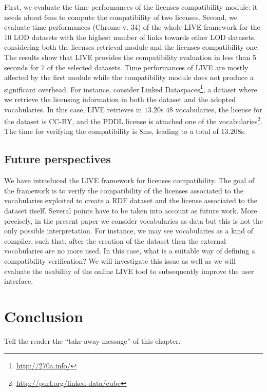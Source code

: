 First, we evaluate the time performances of the licenses compatibility module: it needs about 6ms to compute the compatibility of two licenses. Second, we evaluate time performances (Chrome v. 34) of the whole LIVE framework for the $10$ LOD datasets with the highest number of links towards other LOD datasets, considering both the licenses retrieval module and the licenses compatibility one. The results show that LIVE provides the compatibility evaluation in less than 5 seconds for $7$ of the selected datasets. Time performances of LIVE are mostly affected by the first module while the compatibility module does not produce a significant overhead. For instance, consider Linked Dataspaces\footnote{\url{http://270a.info/}}, a dataset where we retrieve the licensing information in both the dataset and the adopted vocabularies. In this case, LIVE retrieves in $13.20$s $48$ vocabularies, the license for the dataset is CC-BY, and the PDDL license is attached one of the vocabularies\footnote{\url{http://purl.org/linked-data/cube}}. The time for verifying the compatibility is $8$ms, leading to a total of $13.208$s.

\subsection{Future perspectives}
We have introduced the LIVE framework for licenses compatibility. The goal of the framework is to verify the compatibility of the licenses associated to the vocabularies exploited to create a RDF dataset and the license associated to the dataset itself. Several points have to be taken into account as future work. More precisely, in the present paper we consider vocabularies as data but this is not the only possible interpretation. For instance, we may see vocabularies as a kind of compiler, such that, after the creation of the dataset then the external vocabularies are no more used. In this case, what is a suitable way of defining a compatibility verification? We will investigate this issue as well as we will evaluate the usability of the online LIVE tool to subsequently improve the user interface.


\section{Conclusion}
Tell the reader the ``take-away-message'' of this chapter.



